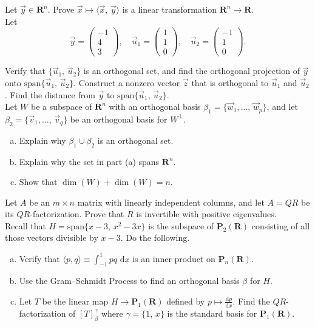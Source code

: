\documentclass[a4paper,11pt]{article}
\newcommand{\R}{\mathbf{R}}
\newcommand{\PP}{\mathbf{P}}
\begin{document}
 Let $\vec y \in \R^n$. Prove $\vec x \mapsto
\langle \vec x,\,\vec y \rangle$ is a linear transformation $\R^n \rightarrow
\R$. \\

 Let
\[
  \vec y =
  \left(
    \begin{array}{r}
      -1\\4\\3
    \end{array}
  \right), \quad
  \vec u_1 =
  \left(
    \begin{array}{r}
      1\\1\\0
    \end{array}
  \right), \quad
  \vec u_2 =
  \left(
    \begin{array}{r}
      -1\\1\\0
    \end{array}
  \right).
\]

\noindent Verify that $\{\vec u_1,\,\vec u_2\}$ is an orthogonal set, and find
the orthogonal projection of $\vec y$ onto $\text{span}\{\vec u_1,\,\vec u_2\}$.
Construct a nonzero vector $\vec z$ that is orthogonal to $\vec u_1$ and $\vec
u_2$. Find the distance from $\vec y$ to $\text{span}\{\vec u_1,\,\vec u_2\}$.
\\

 Let $W$ be a subspace of $\R^n$ with an orthogonal
basis $\beta_1=\{\vec w_1, \dots,\,\vec w_p\}$, and let $\beta_2=\{\vec
v_1,\dots,\,\vec v_q\}$ be an orthogonal basis for $W^\perp$.
\begin{enumerate}[(a)]
\item Explain why $\beta_1 \cup \beta_2$ is an orthogonal set.
\item Explain why the set in part (a) spans $\R^n$.
\item Show that $\dim(W)+\dim(W)=n$. \\
\end{enumerate}

 Let $A$ be an $m \times n$ matrix with linearly
independent columns, and let $A=QR$ be its $QR$-factorization. Prove that $R$ is
invertible with positive eigenvalues. \\

 Recall that
$H=\text{span}\{x-3,\,x^2-3x\}$ is the subspace of $\PP_2(\R)$
consisting of all those vectors divisible by $x-3$. Do the following.
\begin{enumerate}[(a)]
\item Verify that $\langle p,q \rangle \equiv \int_{-1}^1pq\text{ d}x$ is an
  inner product on $\PP_n(\R)$.
\item Use the Gram--Schmidt Process to find an orthogonal basis $\beta$ for $H$.
\item Let $T$ be the linear map $H \rightarrow \PP_1(\R)$ defined by $p
  \mapsto \frac{\text{d}p}{\text{d}x}$. Find the $QR$-factorization of
  $[T]_{\beta}^\gamma$ where $\gamma=\{1,\,x\}$ is the standard basis for
  $\PP_1(\R)$.
\end{enumerate}
\end{document}
